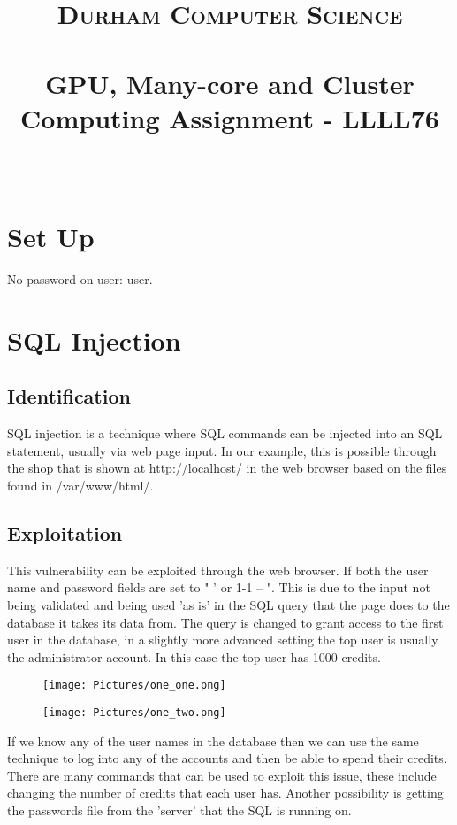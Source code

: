 \documentclass[paper=a4, fontsize=11pt]{scrartcl}
\date{}
\title{
		\vspace{-1in} 	
		\usefont{OT1}{bch}{b}{n}
		\normalfont \normalsize \textsc{Durham Computer Science} \\ [5pt]
		\horrule{0.5pt} \\[0.4cm]
		\large  GPU, Many-core and Cluster Computing Assignment - LLLL76\\
		\horrule{2pt} \\[0.5cm]
		\vspace{-1in} 	
}
\numberwithin{equation}{section}		%
\numberwithin{figure}{section}			%
\numberwithin{table}{section}				%
\begin{document}
\maketitle
\section*{Set Up}

No password on user: user.

\section*{SQL Injection}
\subsection*{Identification}

SQL injection is a technique where SQL commands can be injected into an SQL statement, usually via web page input. In our example, this is possible through the shop that is shown at http://localhost/ in the web browser based on the files found in /var/www/html/.

\subsection*{Exploitation}

This vulnerability can be exploited through the web browser. If both the user name and password fields are set to " ' or 1-1 -- ". This is due to the input not being validated and being used 'as is' in the SQL query that the page does to the database it takes its data from. The query is changed to grant access to the first user in the database, in a slightly more advanced setting the top user is usually the administrator account. In this case the top user has 1000 credits.

\begin{figure}[h]
\centering
\texttt{[image: Pictures/one\_one.png]}
\end{figure}

\begin{figure}[h]
\centering
\texttt{[image: Pictures/one\_two.png]}
\end{figure}

If we know any of the user names in the database then we can use the same technique to log into any of the accounts and then be able to spend their credits. There are many commands that can be used to exploit this issue, these include changing the number of credits that each user has. Another possibility is getting the passwords file from the 'server' that the SQL is running on.
\end{document}
